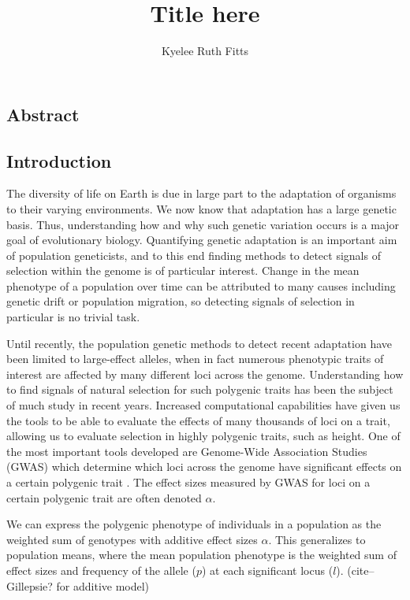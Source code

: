 \documentclass[a4paper,11pt]{article}
\newcommand{\jb}[1]{{\color{blue} (#1)} }
\begin{document}
\title{\vspace{-2cm}
  Title here
}
\author{Kyelee Ruth Fitts}
\maketitle


\subsection*{Abstract}

\subsection*{Introduction}

The diversity of life on Earth is due in large part to the
adaptation of organisms to their varying environments. We now know that
adaptation has a large genetic basis. Thus, understanding how and why such
genetic variation occurs is a major goal of evolutionary
biology. Quantifying genetic adaptation is an important aim of population
geneticists, and to this end finding methods to detect signals of
selection within the genome is of particular interest. Change in the
mean phenotype of a population over time can be attributed to many causes including genetic
drift or population migration, so detecting signals of selection in
particular is no trivial task.

Until recently, the population genetic methods to detect recent adaptation have been limited to
large-effect alleles, when in fact numerous phenotypic traits of interest
are affected by many different loci across the genome. Understanding
how to find signals of natural selection for such polygenic traits has been
the subject of much study in recent years. Increased computational
capabilities have given us the tools to be able to evaluate the effects
of many thousands of loci on a trait, allowing us to evaluate
selection in highly polygenic traits, such as height. One of the most
important tools developed are Genome-Wide Association Studies (GWAS)
which determine which loci across the genome have significant effects
on a certain polygenic trait \cite{gwasoverview}. The effect sizes
measured by GWAS for loci on a certain polygenic trait are often
denoted $\alpha$.

We can express the polygenic phenotype of individuals in a population
as the weighted sum of genotypes with additive effect sizes
$\alpha$. This generalizes to population means, where the mean
population phenotype is the weighted sum of effect sizes and frequency
of the allele ($p$) at each significant locus ($l$). \jb{cite--
  Gillepsie? for additive model} 
\end{document}
